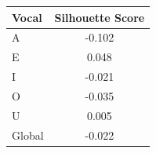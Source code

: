 \begin{tabular}{lc}
\toprule
\rowcolor{col01}
Vocal & Silhouette Score \\
\midrule
A & -0.102 \\
E & 0.048 \\
I & -0.021 \\
O & -0.035 \\
U & 0.005 \\
Global & -0.022 \\
\bottomrule
\end{tabular}
